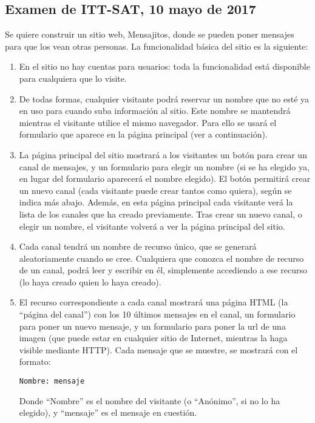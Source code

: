 {\subsection{Examen de ITT-SAT, 10 mayo de 2017}

Se quiere construir un sitio web, Mensajitos, donde se pueden poner mensajes para que los vean otras personas. La funcionalidad básica del sitio es la siguiente:

\begin{enumerate}
\item En el sitio no hay cuentas para usuarios: toda la funcionalidad está disponible para cualquiera que lo visite.
\item De todas formas, cualquier visitante podrá reservar un nombre que no esté ya en uso para cuando suba información al sitio. Este nombre se mantendrá mientras el visitante utilice el mismo navegador. Para ello se usará el formulario que aparece en la página principal (ver a continuación).
\item La página principal del sitio mostrará a los visitantes un botón para crear un canal de mensajes, y un formulario para elegir un nombre (si se ha elegido ya, en lugar del formulario aparecerá el nombre elegido). El botón permitirá crear un nuevo canal (cada visitante puede crear tantos como quiera), según se indica más abajo. Además, en esta página principal cada visitante verá la lista de los canales que ha creado previamente. Tras crear un nuevo canal, o elegir un nombre, el visitante volverá a ver la página principal del sitio.
\item Cada canal tendrá un nombre de recurso único, que se generará aleatoriamente cuando se cree. Cualquiera que conozca el nombre de recurso de un canal, podrá leer y escribir en él, simplemente accediendo a ese recurso (lo haya creado quien lo haya creado).
\item El recurso correspondiente a cada canal mostrará una página HTML (la ``página del canal'') con los 10 últimos mensajes en el canal, un formulario para poner un nuevo mensaje, y un formulario para poner la url de una imagen (que puede estar en cualquier sitio de Internet, mientras la haga visible mediante HTTP). Cada mensaje que se muestre, se mostrará con el formato:

\begin{verbatim}
Nombre: mensaje
\end{verbatim}

Donde ``Nombre'' es el nombre del visitante (o ``Anónimo'', si no lo ha elegido), y ``mensaje'' es el mensaje en cuestión.


\end{enumerate}}
